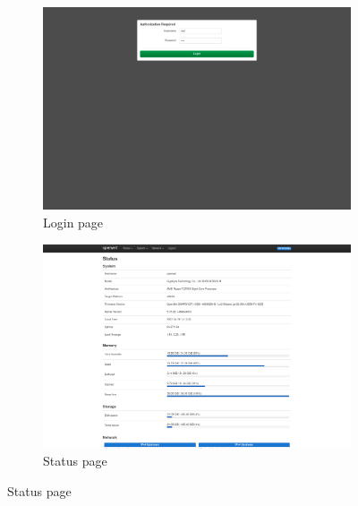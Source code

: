 \begin{figure}[H]
    \centering

    \begin{subfigure}{0.5\textwidth}
        \centering
        \includegraphics[height=0.6\linewidth]{immagini/LuCI_login}
        \caption{Login page}
        \label{fig:luci-login}
    \end{subfigure}%
    \hfill
    \begin{subfigure}{0.5\textwidth}
        \centering
        \includegraphics[height=0.6\linewidth]{immagini/LuCI_status}
        \caption{Status page}
        \label{fig:luci-status}
    \end{subfigure}%


\end{figure}
